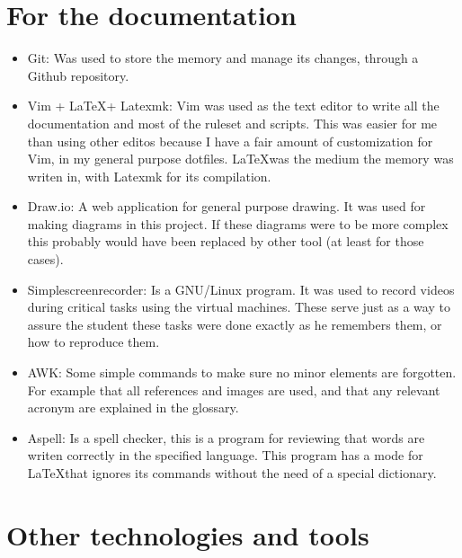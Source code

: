 \section{For the documentation}
\begin{itemize}
	\item Git: Was used to store the memory and manage its changes, through a Github repository\cite{memoria_github}.
	\item Vim + \LaTeX + Latexmk: Vim was used as the text editor to write all the documentation and most of the ruleset and scripts. This was easier for me than using other editos because I have a fair amount of customization for Vim, in my general purpose dotfiles\cite{andresgomezvidal_gitlab}. \LaTeX was the medium the memory was writen in, with Latexmk for its compilation.
	\item Draw.io: A web application for general purpose drawing\cite{drawio}. It was used for making diagrams in this project. If these diagrams were to be more complex this probably would have been replaced by other tool (at least for those cases).
	\item Simplescreenrecorder: Is a GNU/Linux program. It was used to record videos during critical tasks using the virtual machines. These serve just as a way to assure the student these tasks were done exactly as he remembers them, or how to reproduce them.
	\item AWK: Some simple commands to make sure no minor elements are forgotten. For example that all references and images are used, and that any relevant acronym are explained in the glossary.
	\item Aspell: Is a spell checker\cite{aspell}, this is a program for reviewing that words are writen correctly in the specified language. This program has a mode for \LaTeX that ignores its commands without the need of a special dictionary.
\end{itemize}

\section{Other technologies and tools}
